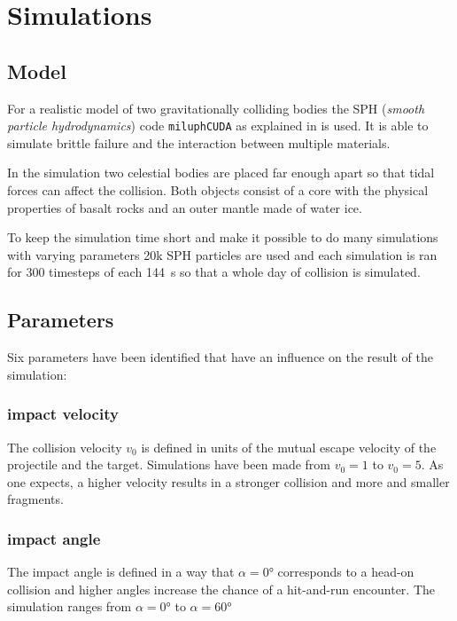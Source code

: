 

\chapter{Simulations}

\section{Model}

For a realistic model of two gravitationally colliding bodies the SPH (\textit{smooth particle hydrodynamics}) code \texttt{miluphCUDA} as explained in \cite{Schaefer2016} is used. It is able to simulate brittle failure and the interaction between multiple materials. 

In the simulation two celestial bodies are placed far enough apart so that tidal forces can affect the collision. Both objects consist of a core with the physical properties of basalt rocks and an outer mantle made of water ice. 

To keep the simulation time short and make it possible to do many simulations with varying parameters 20k SPH particles are used and each simulation is ran for 300 timesteps of each \SI{144}{\second} so that a whole day of collision is simulated.


\section{Parameters}
\label{sec:parameters}

Six parameters have been identified that have an influence on the result of the simulation:

\subsection{impact velocity}

The collision velocity $v_0$ is defined in units of the mutual escape velocity of the projectile and the target. Simulations have been made from $v_0=1$ to $v_0=5$. As one expects, a higher velocity results in a stronger collision and more and smaller fragments.

\subsection{impact angle}

The impact angle is defined in a way that $\alpha=\ang{0}$ corresponds to a head-on collision and higher angles increase the chance of a hit-and-run encounter. The simulation ranges from $\alpha=\ang{0}$ to $\alpha=\ang{60}$

